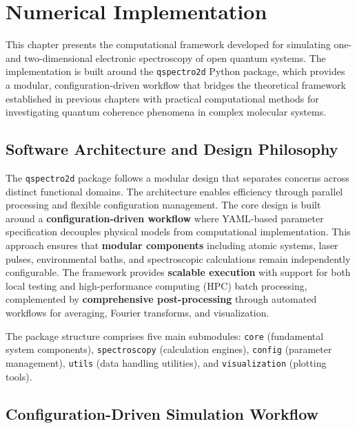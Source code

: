\chapter{Numerical Implementation}
\label{chap:numerical_implementation} %


\noindent
This chapter presents the computational framework developed for simulating one- and two-dimensional electronic spectroscopy of open quantum systems. The implementation is built around the \texttt{qspectro2d} Python package, which provides a modular, configuration-driven workflow that bridges the theoretical framework established in previous chapters with practical computational methods for investigating quantum coherence phenomena in complex molecular systems.

\section{Software Architecture and Design Philosophy}
\label{sec:software_architecture}

\noindent
The \texttt{qspectro2d} package follows a modular design that separates concerns across distinct functional domains. The architecture enables efficiency through parallel processing and flexible configuration management. The core design is built around a \textbf{configuration-driven workflow} where YAML-based parameter specification decouples physical models from computational implementation. This approach ensures that \textbf{modular components} including atomic systems, laser pulses, environmental baths, and spectroscopic calculations remain independently configurable. The framework provides \textbf{scalable execution} with support for both local testing and high-performance computing (HPC) batch processing, complemented by \textbf{comprehensive post-processing} through automated workflows for averaging, Fourier transforms, and visualization.

\noindent
The package structure comprises five main submodules: \texttt{core} (fundamental system components), \texttt{spectroscopy} (calculation engines), \texttt{config} (parameter management), \texttt{utils} (data handling utilities), and \texttt{visualization} (plotting tools).

\section{Configuration-Driven Simulation Workflow}
\label{sec:configuration_workflow}

